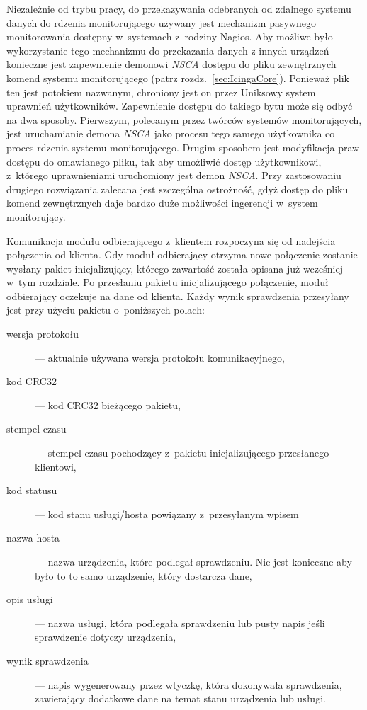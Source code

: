 Niezależnie od trybu pracy, do przekazywania odebranych od zdalnego
systemu danych do rdzenia monitorującego używany jest mechanizm
pasywnego monitorowania dostępny w~systemach z~rodziny Nagios. Aby
możliwe było wykorzystanie tego mechanizmu do przekazania danych z
innych urządzeń konieczne jest zapewnienie demonowi {\em NSCA} dostępu do
pliku zewnętrznych komend systemu monitorującego (patrz
rozdz.~\ref{sec:IcingaCore}). Ponieważ plik ten jest potokiem
nazwanym, chroniony jest on przez Uniksowy system uprawnień
użytkowników. Zapewnienie dostępu do takiego bytu może się odbyć na
dwa sposoby. Pierwszym, polecanym przez twórców systemów
monitorujących, jest uruchamianie demona {\em NSCA} jako procesu tego samego
użytkownika co proces rdzenia systemu monitorującego. Drugim sposobem
jest modyfikacja praw dostępu do omawianego pliku, tak aby umożliwić
dostęp użytkownikowi, z~którego uprawnieniami uruchomiony jest demon
{\em NSCA}. Przy zastosowaniu drugiego rozwiązania zalecana jest szczególna
ostrożność, gdyż dostęp do pliku komend zewnętrznych daje bardzo duże
możliwości ingerencji w~system monitorujący.

Komunikacja modułu odbierającego z~klientem rozpoczyna się od
nadejścia połączenia od klienta. Gdy moduł odbierający otrzyma nowe
połączenie zostanie wysłany pakiet inicjalizujący, którego zawartość
została opisana już wcześniej w~tym rozdziale. Po przesłaniu pakietu
inicjalizującego połączenie, moduł odbierający oczekuje na dane od
klienta. Każdy wynik sprawdzenia przesyłany jest przy użyciu pakietu
o~poniższych polach:

\begin{description}
\item[wersja protokołu] ---  aktualnie używana wersja protokołu komunikacyjnego,
\item[kod CRC32] ---  kod CRC32 bieżącego pakietu,
\item[stempel czasu] --- stempel czasu pochodzący z~pakietu
  inicjalizującego przesłanego klientowi,
\item[kod statusu] --- kod stanu usługi/hosta powiązany z~przesyłanym wpisem
\item[nazwa hosta] --- nazwa urządzenia, które podlegał sprawdzeniu. Nie jest
  konieczne aby było to to samo urządzenie, który dostarcza dane,
\item[opis usługi] --- nazwa usługi, która podlegała sprawdzeniu lub pusty
  napis jeśli sprawdzenie dotyczy urządzenia,
\item[wynik sprawdzenia] --- napis wygenerowany przez wtyczkę, która
  dokonywała sprawdzenia, zawierający dodatkowe dane na temat stanu
  urządzenia lub usługi.
\end{description}

